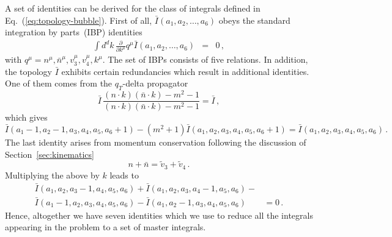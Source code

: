 \documentclass[a4paper,11pt]{article}
\newcommand{\nbar}{\ensuremath{\bar{n}}}
\numberwithin{equation}{section}
\begin{document}
A set of identities can be derived for the class of integrals defined in
Eq.~(\ref{eq:topology-bubble}). First of all, $\bar I(a_1,a_2,\ldots, a_{6})$
obeys the standard integration by parts~(IBP) identities
%
\begin{eqnarray}
   \int d^dk\, \frac{\partial}{\partial k^\mu} q^\mu 
   \bar I(a_1,a_2,\ldots, a_{6}) & = & 0\,,
\end{eqnarray}
%
with $q^\mu = n^\mu, \nbar^\mu, v_3^\mu, v_4^\mu, k^\mu$. The set of IBPs
consists of five relations. In addition, the topology $\bar I$ exhibits certain
redundancies which result in additional identities. One of them comes from the
$q_T$-delta propagator
%
\begin{equation}
  \bar I\, \frac{(n\cdot k) (\nbar\cdot k) - m^2-1}
         {(n\cdot k) (\nbar\cdot k) - m^2-1}  = \bar I\,,
\end{equation}
%
which gives
%
\begin{equation}
  \bar I(a_1-1, a_2-1, a_3, a_4, a_5, a_6+1)  
  - (m^2+1) \bar I(a_1, a_2, a_3, a_4, a_5, a_6+1)   =
  \bar I(a_1, a_2, a_3, a_4, a_5, a_6)\,.
\end{equation}
%
The last identity arises from  momentum conservation following the
discussion of Section~\ref{sec:kinematics}
%
\begin{equation}
  n + \nbar = \tilde v_3 + \tilde v_4\,.
\end{equation}
Multiplying the above by $k$ leads to 
%
%
\begin{align}
  \bar I(a_1, a_2, a_3-1, a_4, a_5, a_6) +
  \bar I(a_1, a_2, a_3, a_4-1, a_5, a_6) -
  \nonumber \\
  \bar I(a_1-1, a_2, a_3, a_4, a_5, a_6) -
  \bar I(a_1, a_2-1, a_3, a_4, a_5, a_6) & = 0\,.
\end{align}
%
Hence, altogether  we have  seven identities which we use to reduce all
the integrals appearing in the problem to a set of master integrals.
\end{document}
